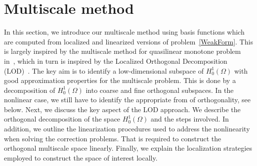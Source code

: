 \documentclass{article}
\begin{document}
\section{Multiscale method}\label{SectionMultiscaleMethod}
In this section, we introduce our multiscale method using basis functions which are computed from localized and linearized versions of problem~\eqref{WeakForm}. This is largely inspired by the multiscale method for quasilinear monotone problem in~\cite{Barbara}, which in turn is inspired by the Localized Orthogonal Decomposition (LOD)~\cite{LOD-Linear}. The key aim is to identify a low-dimensional subspace of $H^1_0(\Omega)$ with good approximation properties for the multiscale problem. This is done by a decomposition of $H_0^1(\Omega)$ into coarse and fine orthogonal subspaces. In the nonlinear case, we still have to identify the appropriate from of orthogonality, see below. Next, we discuss the key aspect of the LOD approach. We describe the orthogonal decomposition of the space $H_0^1(\Omega)$ and the steps involved. In addition, we outline the linearization procedures used to address the nonlinearity when solving the correction problems. That is required to construct the orthogonal multiscale space linearly. Finally, we explain the localization strategies employed to construct the space of interest locally. 
\end{document}

